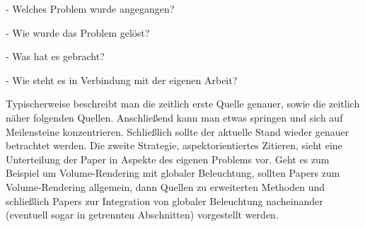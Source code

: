     - Welches Problem wurde angegangen?

    - Wie wurde das Problem gelöst?

    - Was hat es gebracht?

    - Wie steht es in Verbindung mit der eigenen Arbeit?



Typischerweise beschreibt man die zeitlich erste Quelle genauer, sowie die zeitlich näher folgenden Quellen. 
Anschließend kann man etwas springen und sich
auf Meilensteine konzentrieren. Schließlich sollte der aktuelle Stand wieder genauer betrachtet werden. 
Die zweite Strategie, aspektorientiertes Zitieren, sieht eine Unterteilung der Paper in Aspekte des
eigenen Problems vor. Geht es zum Beispiel um Volume-Rendering mit globaler Beleuchtung, sollten
Papers zum Volume-Rendering allgemein, dann Quellen zu erweiterten Methoden und schließlich Papers 
zur Integration von globaler Beleuchtung nacheinander (eventuell sogar in getrennten Abschnitten)
vorgestellt werden.